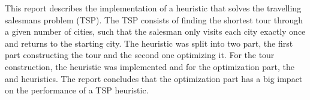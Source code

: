 This report describes the implementation of a heuristic that solves the
travelling salesmans problem (TSP). The TSP consists of finding the shortest 
tour through a given number of cities, such that the salesman only visits each
city exactly once and returns to the starting city. 
The heuristic was split into two part, the first part constructing the tour and
the second one optimizing it. For the tour construction, the
 heuristic was implemented and for the optimization
part, the  and  heuristics. The report concludes that the optimization
part has a big impact on the performance of a TSP heuristic.
